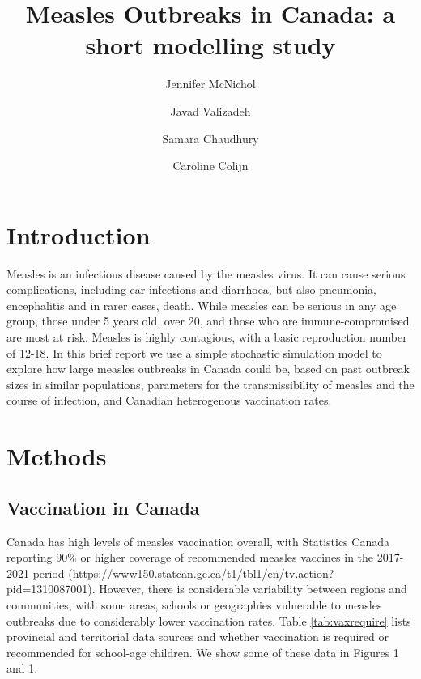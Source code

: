 \documentclass[12pt,a4paper]{article}
\begin{document}
\title{Measles Outbreaks in Canada: a short modelling study
}


\author[1]{Jennifer McNichol}
\author[1]{Javad Valizadeh}
\author[1]{Samara Chaudhury}
\author[1,*]{Caroline Colijn}


\maketitle

\section{Introduction}

Measles is an infectious disease caused by the measles virus. It can cause serious complications, including ear infections and diarrhoea, but also pneumonia, encephalitis and in rarer cases, death. While measles can be serious in any age group, those under 5 years old, over 20, and those who are immune-compromised are most at risk. Measles is highly contagious, with a basic reproduction number of 12-18.
In this brief report we use a simple stochastic simulation model to explore how large measles outbreaks in Canada could be, based on past outbreak sizes in similar populations, parameters for the transmissibility of measles and the course of infection, and Canadian heterogenous vaccination rates.

\section{Methods}

\subsection{Vaccination in Canada}

Canada has high levels of measles vaccination overall, with Statistics Canada reporting 90\% or higher coverage of recommended measles vaccines in the 2017-2021 period (https://www150.statcan.gc.ca/t1/tbl1/en/tv.action?pid=1310087001). However, there is considerable variability between regions and communities, with some areas, schools or geographies vulnerable to measles outbreaks due to considerably lower vaccination rates. Table \ref{tab:vaxrequire} lists provincial and territorial data sources and whether vaccination is required or recommended for school-age children. We show some of these data in Figures 1 and 1.
\end{document}
